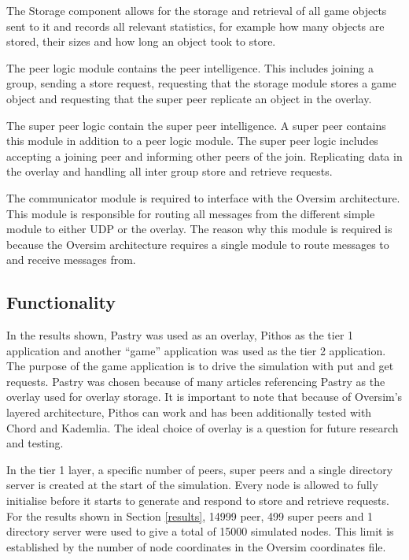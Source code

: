\documentclass[10pt,a4paper,conference]{IEEEtran}
\begin{document}
The Storage component allows for the storage and retrieval of all game objects sent to it and records all relevant statistics, for example how many
objects are stored, their sizes and how long an object took to store.

The peer logic module contains the peer intelligence. This includes joining a group, sending a store request, requesting that the storage module
stores a game object and requesting that the super peer replicate an object in the overlay.

The super peer logic contain the super peer intelligence. A super peer contains this module in addition to a peer logic module. The super peer logic
includes accepting a joining peer and informing other peers of the join. Replicating data in the overlay and handling all inter group store and
retrieve requests.

The communicator module is required to interface with the Oversim architecture. This module is responsible for routing all messages from the
different simple module to either UDP or the overlay. The reason why this module is required is because the Oversim architecture requires a single
module to route messages to and receive messages from.

\subsection{Functionality}

In the results shown, Pastry was used as an overlay, Pithos as the tier 1 application and another ``game'' application was used as the tier 2
application. The purpose of the game application is to drive the simulation with put and get requests. Pastry was chosen because of many articles
referencing Pastry as the overlay used for overlay storage. It is important to note that because of Oversim's layered architecture, Pithos can work
and has been additionally tested with Chord and Kademlia. The ideal choice of overlay is a question for future research and testing.

In the tier 1 layer, a specific number of peers, super peers and a single directory server is created at the start of the simulation. Every node is
allowed to fully initialise before it starts to generate and respond to store and retrieve requests. For the results shown in Section \ref{results},
14999 peer, 499 super peers and 1 directory server were used to give a total of 15000 simulated nodes. This limit is established by the number of
node coordinates in the Oversim coordinates file.
\end{document}
